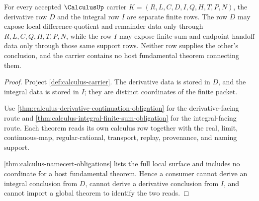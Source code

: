 \begin{theorem}
\label{thm:calculus-derivative-integral-separation-obligation}
For every accepted $\CalculusUp$ carrier $K=(R,L,C,D,I,Q,H,T,P,N)$, the derivative row $D$ and the integral row $I$ are separate finite rows. The row $D$ may expose local difference-quotient and remainder data only through $R,L,C,Q,H,T,P,N$, while the row $I$ may expose finite-sum and endpoint handoff data only through those same support rows. Neither row supplies the other's conclusion, and the carrier contains no host fundamental theorem connecting them.
\end{theorem}
\begin{proof}
Project \autoref{def:calculus-carrier}. The derivative data is stored in $D$, and the integral data is stored in $I$; they are distinct coordinates of the finite packet.

Use \autoref{thm:calculus-derivative-continuation-obligation} for the derivative-facing route and \autoref{thm:calculus-integral-finite-sum-obligation} for the integral-facing route. Each theorem reads its own calculus row together with the real, limit, continuous-map, regular-rational, transport, replay, provenance, and naming support.

\autoref{thm:calculus-namecert-obligations} lists the full local surface and includes no coordinate for a host fundamental theorem. Hence a consumer cannot derive an integral conclusion from $D$, cannot derive a derivative conclusion from $I$, and cannot import a global theorem to identify the two reads.
\end{proof}

